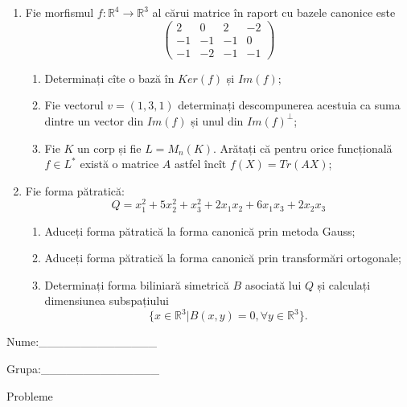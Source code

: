 \documentclass{article}
\begin{document}
\begin{enumerate}
 \item Fie morfismul $f:\mathbb{R}^4 \to \mathbb{R}^3$ al cărui matrice în raport cu bazele canonice este
$$\begin{pmatrix}
2&0&2&-2\\
-1&-1&-1&0\\
-1&-2&-1&-1
\end{pmatrix}$$

\begin{enumerate}
\item Determinați cîte o bază în $Ker(f)$ și $Im(f)$;
\item Fie vectorul $v=(1,3,1)$ determinați descompunerea acestuia ca suma dintre un vector din $Im(f)$ și unul din $Im(f)^\perp$;
\item Fie $K$ un corp și fie $L=M_n(K)$. Arătați că pentru orice funcțională $f \in L^*$ există o matrice $A$ astfel încît $f(X)=Tr(AX)$;
\end{enumerate}
\item Fie forma pătratică:
$$Q= x_1^2+5x_2^2+x_3^2+2x_1x_2+6x_1x_3+2x_2x_3$$

\begin{enumerate}
\item Aduceți forma pătratică la forma canonică prin metoda Gauss;
\item Aduceți forma pătratică la forma canonică prin transformări ortogonale;
\item Determinați forma biliniară simetrică $B$ asociată lui $Q$ și calculați dimensiunea subspațiului
$$\{x \in \mathbb{R}^3 | B(x,y)=0,\forall y \in \mathbb{R}^3\}.$$

\end{enumerate}
\end{enumerate}
\newpage
\begin{flushright}
Nume:\_\_\_\_\_\_\_\_\_\_\_\_\_\_
 
 
Grupa:\_\_\_\_\_\_\_\_\_\_\_\_\_\_
\end{flushright}
\begin{center}
\vspace{2cm}
{\Large Probleme}
\vspace{2cm}
\end{center}
\end{document}
